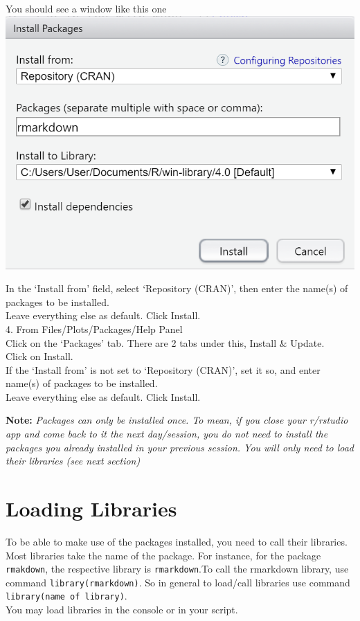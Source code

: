 \documentclass[
]{book}
\begin{document}
You should see a window like this one \includegraphics{tutorial_screenshots/install_rmkdn_toolstab.png}

In the `Install from' field, select `Repository (CRAN)', then enter the name(s) of packages to be installed.\\
Leave everything else as default. Click Install.\\
4. From Files/Plots/Packages/Help Panel\\
Click on the `Packages' tab. There are 2 tabs under this, Install \& Update.\\
Click on Install.\\
If the `Install from' is not set to `Repository (CRAN)', set it so, and enter name(s) of packages to be installed.\\
Leave everything else as default. Click Install.

\textbf{Note:} \emph{Packages can only be installed once. To mean, if you close your r/rstudio app and come back to it the next day/session, you do not need to install the packages you already installed in your previous session. You will only need to load their libraries (see next section)}

\hypertarget{loading-libraries}{%
\section{Loading Libraries}\label{loading-libraries}}

To be able to make use of the packages installed, you need to call their libraries. Most libraries take the name of the package. For instance, for the package \texttt{rmakdown}, the respective library is \texttt{rmarkdown}.To call the rmarkdown library, use command \texttt{library(rmarkdown)}.
So in general to load/call libraries use command \texttt{library(name\ of\ library)}.\\
You may load libraries in the console or in your script.
\end{document}

